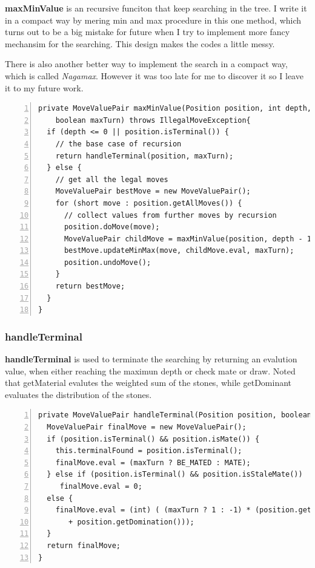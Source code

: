 \documentclass{article}
\begin{document}
\textbf{maxMinValue} is an recursive funciton that keep searching in the tree. I write it in a compact way by mering min and max procedure in this one method, which turns out to be a big mistake for future when I try to implement more fancy mechansim for the searching. This design makes the codes a little messy.

There is also another better way to implement the search in a compact way, which is called \emph{Nagamax}. However it was too late for me to discover it so I leave it to my future work.

\begin{lstlisting}[numbers=left]
private MoveValuePair maxMinValue(Position position, int depth, 
    boolean maxTurn) throws IllegalMoveException{
  if (depth <= 0 || position.isTerminal()) {
    // the base case of recursion
    return handleTerminal(position, maxTurn);
  } else {
    // get all the legal moves
    MoveValuePair bestMove = new MoveValuePair();
    for (short move : position.getAllMoves()) {
      // collect values from further moves by recursion
      position.doMove(move);
      MoveValuePair childMove = maxMinValue(position, depth - 1, !maxTurn);
      bestMove.updateMinMax(move, childMove.eval, maxTurn);
      position.undoMove();
    }
    return bestMove;
  }
}
\end{lstlisting}

\subsubsection{handleTerminal}

\textbf{handleTerminal} is used to terminate the searching by returning an evalution value, when either reaching the maximun depth or check mate or draw. Noted that getMaterial evalutes the weighted sum of the stones, while getDominant evaluates the distribution of the stones.

\begin{lstlisting}[numbers=left]
private MoveValuePair handleTerminal(Position position, boolean maxTurn) {
  MoveValuePair finalMove = new MoveValuePair();
  if (position.isTerminal() && position.isMate()) {
    this.terminalFound = position.isTerminal();
    finalMove.eval = (maxTurn ? BE_MATED : MATE);
  } else if (position.isTerminal() && position.isStaleMate())
     finalMove.eval = 0;
  else {
    finalMove.eval = (int) ( (maxTurn ? 1 : -1) * (position.getMaterial() 
       + position.getDomination()));
  }
  return finalMove;
}
\end{lstlisting}
\end{document}
